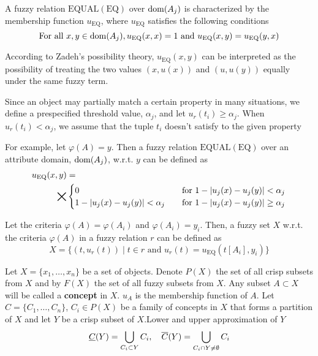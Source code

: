 \documentclass[11pt]{article}
\def \EQ {\text{EQ}}
\def \EQUAL {\text{EQUAL}}
\begin{document}
\begin{definition}[]
A fuzzy relation \(\EQUAL(\EQ)\) over \(\operatorname{dom}(A_j)\) is characterized by the
membership function \(u_{\EQ}\), where \(u_{\EQ}\) satisfies the following
conditions
\begin{equation*}
\text{For all }x,y\in\dom(A_j),u_{\EQ}(x,x)=1\text{ and }u_{\EQ}(x,y)=u_{\EQ}(y,x)
\end{equation*}

According to Zadeh's possibility theory, \(u_{\EQ}(x,y)\) can be interpreted
as the possibility of treating the two values \((x,u(x))\) and \((u,u(y))\)
equally under the same fuzzy term.

Since an object may partially match a certain property in many situations, we
define a prespecified threshold value, \(\alpha_j\), and let
\(u_r(t_i)\ge\alpha_j\). When \(u_r(t_i)<\alpha_j\), we assume that the tuple
\(t_i\) doesn't satisfy to the given property

For example, let \(\varphi(A)=y\). Then a fuzzy relation \(\EQUAL(\EQ)\) over an
attribute domain, \(\operatorname{dom}(A_j)\), w.r.t. \(y\) can be defined as
\begin{align*}
u_{\EQ}(x,y)&=\\
\bigtimes
&\begin{cases}
0&\quad\text{for }1-\abs{u_j(x)-u_j(y)}<\alpha_j\\
1-\abs{u_j(x)-u_j(y)}<\alpha_j&\quad\text{for }1-\abs{u_j(x)-u_j(y)}\ge\alpha_j
\end{cases}
\end{align*}
\end{definition}

\begin{definition}[]
Let the criteria \(\varphi(A)=\varphi(A_i)\) and \(\varphi(A_i)=y_i\). Then, a fuzzy set
\(X\) w.r.t. the criteria \(\varphi(A)\) in a fuzzy relation \(r\) can be defined
as
\begin{equation*}
X=\{(t,u_r(t))\mid t\in r\text{ and }u_r(t)=u_{\EQ}(t[A_i],y_i)\}
\end{equation*}
\end{definition}

Let \(X=\{x_1,\dots,x_n\}\) be a set of objects. Denote \(P(X)\) the set of
all crisp subsets from \(X\) and by \(F(X)\) the set of all fuzzy subsets
from \(X\). Any subset \(A\subset X\) will be called a \textbf{concept} in \(X\).
\(u_A\) is the membership function of \(A\). Let \(C=\{C_1,\dots,C_n\}\),
\(C_i\in P(X)\) be a family of concepts in \(X\) that forms a partition of
\(X\) and let \(Y\) be a crisp subset of \(X\).Lower and upper approximation
of \(Y\)
\begin{equation*}
\underline{C}(Y)=\bigcup_{C_i\subset Y}C_i,\quad\overline{C}(Y)=\bigcup_{C_i\cap Y\neq\emptyset}C_i
\end{equation*}
\end{document}
